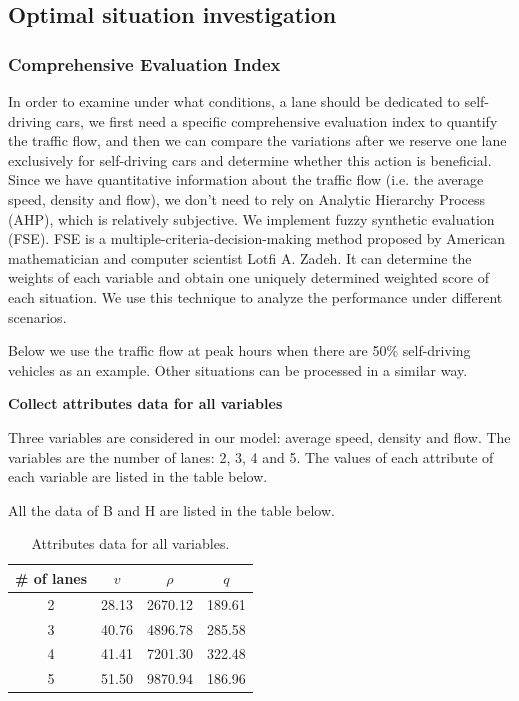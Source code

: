 \documentclass[a4paper]{article}
\begin{document}
	\subsection{Optimal situation investigation}
	\subsubsection{Comprehensive Evaluation Index}
	In order to examine under what conditions, a lane should be dedicated to self-driving cars, we first need a specific comprehensive evaluation index to quantify the traffic flow, and then we can compare the variations after we reserve one lane exclusively for self-driving cars and determine whether this action is beneficial. Since we have quantitative information about the traffic flow (i.e. the average speed, density and flow), we don’t need to rely on Analytic Hierarchy Process (AHP), which is relatively subjective. We implement fuzzy synthetic evaluation (FSE)\cite{fse}. FSE is a multiple-criteria-decision-making method proposed by American mathematician and computer scientist Lotfi A. Zadeh. It can determine the weights of each variable and obtain one uniquely determined weighted score of each situation. We use this technique to analyze the performance under different scenarios.

	Below we use the traffic flow at peak hours when there are 50\% self-driving vehicles as an example. Other situations can be processed in a similar way.

	\textbf{Collect attributes data for all variables}

	Three variables are considered in our model: average speed, density and flow. The variables are the number of lanes: 2, 3, 4 and 5. The values of each attribute of each variable are listed in the table below.

	All the data of B and H are listed in the table below.
\begin{table}[H]
	\begin{center}
		\begin{tabular}{c|ccc}
		\hline
		\# of lanes & $v$   & $\rho$ & $q$ \\
		\hline
		2     & 28.13  & 2670.12  & 189.61  \\
		3     & 40.76  & 4896.78  & 285.58  \\
		4     & 41.41  & 7201.30  & 322.48  \\
		5     & 51.50  & 9870.94  & 186.96  \\
		\hline
		\end{tabular}
	\caption{Attributes data for all variables.}
	\end{center}
\end{table}
\end{document}
